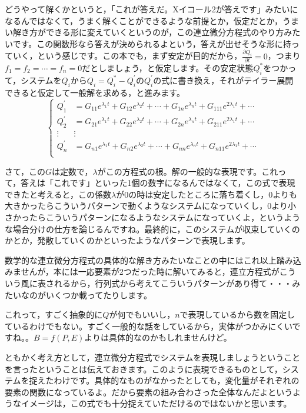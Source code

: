 \documentclass{ltjsbook}
\begin{document}
どうやって解くかというと，「これが答えだ。Xイコール2が答えです」みたいになるんではなくて，うまく解くことができるような前提とか，仮定だとか，うまい解き方ができる形に変えていくというのが，この連立微分方程式のやり方みたいです。この関数形なら答えが決められるよという，答えが出せそうな形に持っていく，という感じです。この本でも，まず安定が目的だから，$\frac{\partial Q_i}{\partial t}=0$，つまり$f_1=f_2=\cdots = f_n=0$だとしましょう，と仮定します。その安定状態$Q_i^{\ast}$をつかって，システムを$Q_i$から$Q_i = Q_i^{\ast} - Q_i^{\prime}$の$Q_i^{\prime}$の式に書き換え，それがテイラー展開できると仮定して一般解を求める，と進みます。
\[
\left\{
    \begin{array}{ccc}
        Q_1^{\prime} &= G_{11}e^{\lambda_1t} + G_{12}e^{\lambda_2t} + \cdots + G_{1n}e^{\lambda_nt} + G_{111}e^{2\lambda_1t}+ \cdots \\
        Q_2^{\prime} &= G_{21}e^{\lambda_1t} + G_{22}e^{\lambda_2t} + \cdots + G_{2n}e^{\lambda_nt} + G_{211}e^{2\lambda_1t}+ \cdots \\
        \vdots &  \vdots\\
        Q_n^{\prime} &= G_{n1}e^{\lambda_1t} + G_{n2}e^{\lambda_2t} + \cdots + G_{nn}e^{\lambda_nt} + G_{n11}e^{2\lambda_1t}+ \cdots \\
    \end{array}
\right.
\]

さて，この$G$は定数で，$\lambda$がこの方程式の根。解の一般的な表現です。これって，答えは「これです」といった1個の数字になるんではなくて，この式で表現できたと考えると，この係数$\lambda$が0の時は安定したところに落ち着くし，0よりも大きかったらこういうパターンで動くようなシステムになっていくし，0より小さかったらこういうパターンになるようなシステムになっていくよ，というような場合分けの仕方を論じるんですね。最終的に，このシステムが収束していくのかとか，発散していくのかといったようなパターンで表現します。

数学的な連立微分方程式の具体的な解き方みたいなことの中にはこれ以上踏み込みませんが，本には一応要素が2つだった時に解いてみると，連立方程式がこういう風に表されるから，行列式から考えてこういうパターンがあり得て・・・みたいなのがいくつか載ってたりします。

これって，すごく抽象的に$Q$が何でもいいし，$n$で表現しているから数を固定しているわけでもない。すごく一般的な話をしているから，実体がつかみにくいですね。。$B=f(P,E)$よりは具体的なのかもしれませんけど。

ともかく考え方として，連立微分方程式でシステムを表現しましょうということを言ったということは伝えておきます。このように表現できるものとして，システムを捉えたわけです。具体的なものがなかったとしても，変化量がそれぞれの要素の関数になっているよ。だから要素の組み合わさった全体なんだよというようなイメージは，この式でも十分捉えていただけるのではないかと思います。
\end{document}
